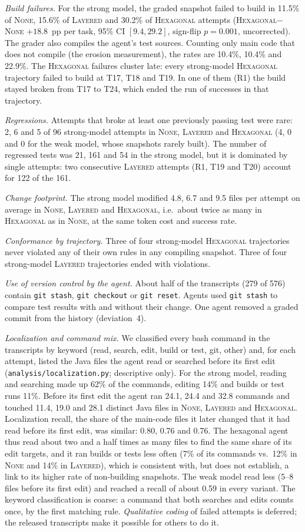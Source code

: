 \documentclass[10pt]{article}
\newcommand{\NONE}{\textsc{None}}
\newcommand{\LAY}{\textsc{Layered}}
\newcommand{\HEX}{\textsc{Hexagonal}}
\newcommand{\code}[1]{\texttt{#1}}
\begin{document}
\emph{Build failures.} For the strong model, the graded snapshot failed to build in 11.5\% of
\NONE, 15.6\% of \LAY{} and 30.2\% of \HEX{} attempts (\HEX$-$\NONE{} $+18.8$~pp per task, 95\% CI
$[9.4, 29.2]$, sign-flip $p=0.001$, uncorrected). The grader also compiles the agent's test
sources. Counting only main code that does not compile (the erosion measurement), the rates are
10.4\%, 10.4\% and 22.9\%. The \HEX{} failures cluster late: every strong-model \HEX{} trajectory failed
to build at T17, T18 and T19. In one of them (R1) the build stayed broken from T17 to T24, which ended the run of
successes in that trajectory.

\emph{Regressions.} Attempts that broke at least one previously passing test were rare: 2, 6 and
5 of 96 strong-model attempts in \NONE, \LAY{} and \HEX{} (4, 0 and 0 for the weak model, whose
snapshots rarely built). The number of regressed tests was 21, 161 and 54 in the strong model, but
it is dominated by single attempts: two consecutive \LAY{} attempts (R1, T19 and T20) account for
122 of the 161.

\emph{Change footprint.} The strong model modified 4.8, 6.7 and 9.5 files per attempt on average
in \NONE, \LAY{} and \HEX{}, i.e.\ about twice as many in \HEX{} as in \NONE, at the same token cost
and success rate.

\emph{Conformance by trajectory.} Three of four strong-model \HEX{} trajectories never violated any
of their own rules in any compiling snapshot. Three of four strong-model \LAY{} trajectories ended
with violations.

\emph{Use of version control by the agent.} About half of the transcripts (279 of 576) contain
\code{git stash}, \code{git checkout} or \code{git reset}. Agents used \code{git stash} to compare
test results with and without their change. One agent removed a graded commit from the history
(deviation~4).

\emph{Localization and command mix.} We classified every bash command in the transcripts by
keyword (read, search, edit, build or test, git, other) and, for each attempt, listed the Java files
the agent read or searched before its first edit (\code{analysis/localization.py}; descriptive only).
For the strong model, reading and searching made up 62\% of the commands, editing 14\% and builds or
test runs 11\%. Before its first edit the agent ran 24.1, 24.4 and 32.8 commands and touched 11.4,
19.0 and 28.1 distinct Java files in \NONE, \LAY{} and \HEX. Localization recall, the share of the
main-code files it later changed that it had read before its first edit, was similar: 0.80, 0.76
and 0.76. The hexagonal agent thus read about two and a half times as many files to find the same
share of its edit targets, and it ran builds or tests less often (7\% of its commands vs.\ 12\% in
\NONE{} and 14\% in \LAY), which is consistent with, but does not establish, a link to its higher
rate of non-building snapshots. The weak model read less (5--8 files before its first edit) and
reached a recall of about 0.59 in every variant. The keyword classification is coarse: a command
that both searches and edits counts once, by the first matching rule. \emph{Qualitative coding} of
failed attempts is deferred; the released transcripts make it possible for others to do it.
\end{document}
